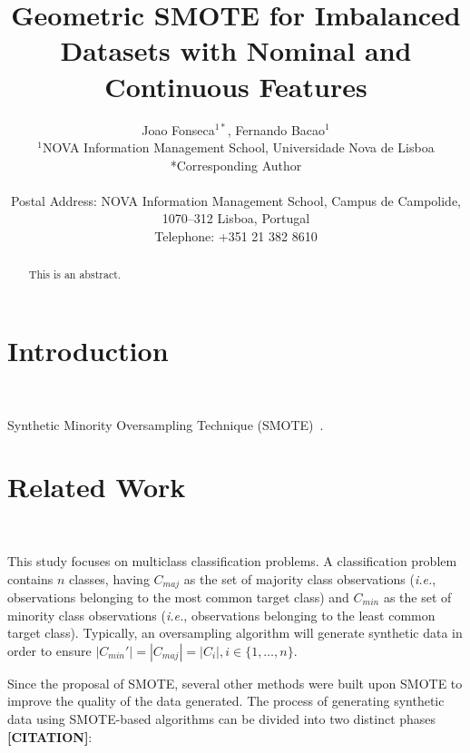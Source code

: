 \documentclass[parskip=full]{scrartcl}
\title{Geometric SMOTE for Imbalanced Datasets with Nominal and Continuous Features}
\author{%
	Joao Fonseca\(^{1*}\), Fernando Bacao\(^{1}\)
	\\
	\small{\(^{1}\)NOVA Information Management School, Universidade Nova de Lisboa}
	\\
	\small{*Corresponding Author}
	\\
	\\
	\small{Postal Address: NOVA Information Management School, Campus de
    Campolide, 1070--312 Lisboa, Portugal}
	\\
	\small{Telephone: +351 21 382 8610}
}
\date{}
\begin{document}
\maketitle

\begin{abstract}
    This is an abstract.
\end{abstract}

\section{Introduction}~\label{sec:introduction}









Synthetic Minority Oversampling Technique (SMOTE)~\cite{Chawla2002}.

\section{Related Work}~\label{sec:related_work}

This study focuses on multiclass classification problems. A classification
problem contains $n$ classes, having $C_{maj}$ as the set of majority class
observations (\textit{i.e.}, observations belonging to the most common target
class) and $C_{min}$ as the set of minority class observations (\textit{i.e.},
observations belonging to the least common target class). Typically, an
oversampling algorithm will generate synthetic data in order to ensure
$|C_{min}'|=|C_{maj}|=|C_i|, i \in \{1, \ldots, n\}$.

Since the proposal of SMOTE, several other methods were built upon SMOTE to
improve the quality of the data generated. The process of generating synthetic
data using SMOTE-based algorithms can be divided into two distinct phases
\textbf{[CITATION]}:
\end{document}
